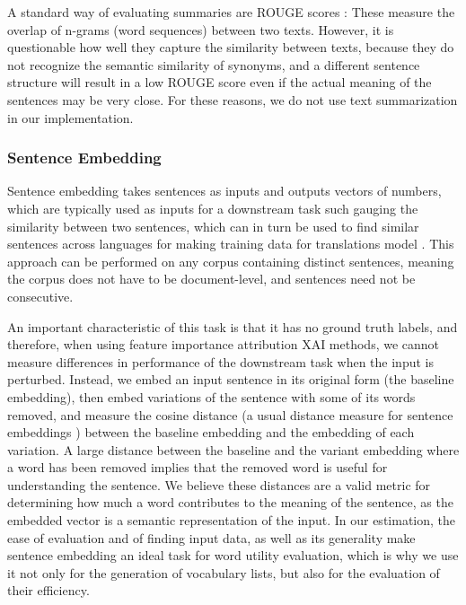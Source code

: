 A standard way of evaluating summaries are ROUGE scores \cite{allahyariTextSummarizationTechniques2017}:
These measure the overlap of n-grams (word sequences) between two texts.
However, it is questionable how well they capture the similarity between texts, because they do not recognize the semantic similarity of synonyms, and a different sentence structure will result in a low ROUGE score even if the actual meaning of the sentences may be very close.
For these reasons, we do not use text summarization in our implementation.

\subsubsection{Sentence Embedding} \label{sec:sentence-embedding}
Sentence embedding takes sentences as inputs and outputs vectors of numbers, which are typically used as inputs for a downstream task such gauging the similarity between two sentences, which can in turn be used to find similar sentences across languages for making training data for translations model \cite{artetxeMassivelyMultilingualSentence2019} \cite{reimersMakingMonolingualSentence2020}.
This approach can be performed on any corpus containing distinct sentences, meaning the corpus does not have to be document-level, and sentences need not be consecutive.

An important characteristic of this task is that it has no ground truth labels, and therefore, when using feature importance attribution XAI methods, we cannot measure differences in performance of the downstream task when the input is perturbed.
Instead, we embed an input sentence in its original form (the baseline embedding), then embed variations of the sentence with some of its words removed, and measure the cosine distance (a usual distance measure for sentence embeddings \cite{reimersMakingMonolingualSentence2020}) between the baseline embedding and the embedding of each variation.
A large distance between the baseline and the variant embedding where a word has been removed implies that the removed word is useful for understanding the sentence.
We believe these distances are a valid metric for determining how much a word contributes to the meaning of the sentence, as the embedded vector is a semantic representation of the input.
In our estimation, the ease of evaluation and of finding input data, as well as its generality make sentence embedding an ideal task for word utility evaluation, which is why we use it not only for the generation of vocabulary lists, but also for the evaluation of their efficiency.

